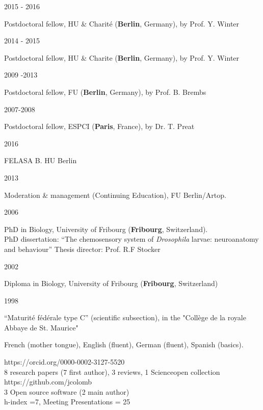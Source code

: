 %
\parbox{0.15\textwidth}{2015 - 2016}\hfill
\parbox[t]{0.83\textwidth}{Postdoctoral fellow,
       HU \& Charit\'e (\textbf{Berlin}, Germany),
        by Prof. Y. Winter%
        }
\parbox{0.15\textwidth}{2014 - 2015}\hfill
\parbox[t]{0.83\textwidth}{Postdoctoral fellow,
       HU \& Charite (\textbf{Berlin}, Germany),
        by Prof. Y. Winter%
        }
%
%
\parbox{0.15\textwidth}{2009 -2013}\hfill
\parbox[t]{0.83\textwidth}{Postdoctoral fellow,
       FU (\textbf{Berlin}, Germany),
        by Prof. B. Brembs%
        }
                \parbox{0.15\textwidth}{2007-2008}\hfill
\parbox[t]{0.83\textwidth}{Postdoctoral fellow,
       ESPCI (\textbf{Paris}, France), by Dr. T. Preat%
        }
   \newpage     
{}
\parbox{0.15\textwidth}{2016}\hfill
\parbox[t]{0.83\textwidth}{FELASA B. HU Berlin
        }
\parbox{0.15\textwidth}{2013}\hfill
\parbox[t]{0.83\textwidth}{Moderation \& management (Continuing Education), FU Berlin/Artop.
        }
\parbox{0.15\textwidth}{2006}\hfill
\parbox[t]{0.83\textwidth}{PhD in Biology,
        University of Fribourg (\textbf{Fribourg}, Switzerland).\\
        PhD dissertation: ``The chemosensory system of \textit{Drosophila} larvae: neuroanatomy and behaviour''
        Thesis director: Prof. R.F Stocker}
\parbox{0.15\textwidth}{2002}\hfill
\parbox[t]{0.83\textwidth}{Diploma in Biology,
        University of Fribourg (\textbf{Fribourg}, Switzerland)
        }
\parbox{0.15\textwidth}{1998}\hfill
\parbox[t]{0.83\textwidth}{``Maturit\'e f\'ed\'erale type C'' (scientific subsection),
in the "Coll\`ege de la royale Abbaye de St. Maurice"}

 French (mother tongue), English (fluent),
German (fluent), Spanish (basics).

%
 https://orcid.org/0000-0002-3127-5520\\
  8 research papers (7 first author), 3 reviews, 1 Scienceopen collection\\
 https://github.com/jcolomb\\
 3 Open source software (2 main author)\\
h-index =7,
Meeting Presentations = 25



